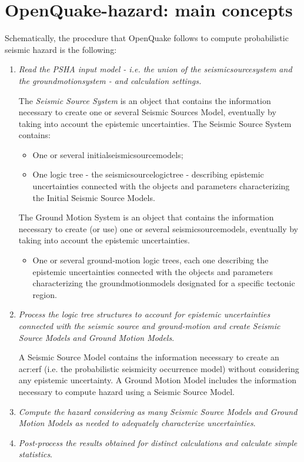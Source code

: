 \section{OpenQuake-hazard: main concepts}
Schematically, the procedure that OpenQuake follows to compute probabilistic 
seismic hazard is the following:
%
\begin{enumerate}
%
\item \emph{Read the PSHA input model - i.e. the union of the 
\gls{seismicsourcesystem} and the \gls{groundmotionsystem} - 
and calculation settings.}
	
	The \emph{Seismic Source System} is an object that contains the 
	information necessary to create one or several Seismic Sources Model, 
	eventually by taking into account the epistemic uncertainties. 
	The Seismic Source System contains:
	\begin{itemize}
	\item One or several \glspl{initialseismicsourcemodel};
	\item One logic tree - the \gls{seismicsourcelogictree} - describing 
	epistemic uncertainties connected with the objects and parameters 
	characterizing the Initial Seismic Source Models.
	\end{itemize}
	
	The Ground Motion System is an object that contains the information 
	necessary to create (or use) one or several \glspl{seismicsourcemodel}, 
	eventually by taking into account the epistemic uncertainties. 
	\begin{itemize}
	\item One or several ground-motion logic trees, each one describing 
	the epistemic uncertainties connected with the objects and parameters 
	characterizing the \glspl{groundmotionmodel} designated for a specific 
	tectonic region.
	\end{itemize}

%
\item \emph{Process the logic tree structures to account for epistemic 
uncertainties connected with the seismic source and ground-motion and
create Seismic Source Models and Ground Motion Models}.
	
	A Seismic Source Model contains the information necessary to create an 
	\gls{acr:erf} (i.e. the probabilistic seismicity occurrence
	model) without con\-sid\-er\-ing any epistemic uncertainty.
	A Ground Motion Model includes the information 
	necessary to compute hazard using a Seismic Source Model. 
\item \emph{Compute the hazard considering as many Seismic Source Models and 
Ground Motion Models as needed to adequately characterize uncertainties}.
\item \emph{Post-process the results obtained for distinct calculations and
calculate simple statistics}.
\end{enumerate}
%
